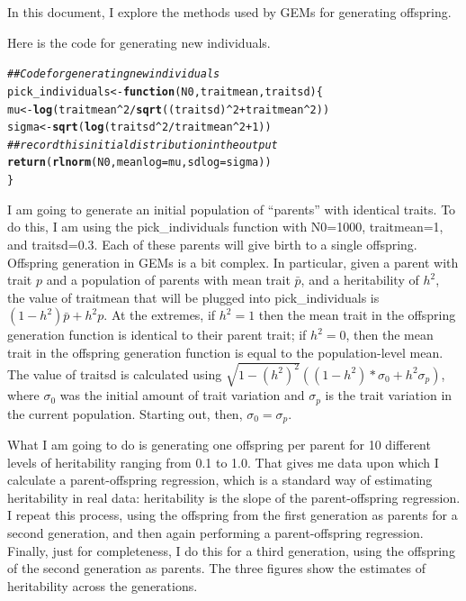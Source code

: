 \documentclass[12pt,reqno,final,pdftex]{amsart}\usepackage[]{graphicx}\usepackage[]{color}
\makeatletter
\newcommand{\hlnum}[1]{\textcolor[rgb]{0.686,0.059,0.569}{#1}}%
\newcommand{\hlcom}[1]{\textcolor[rgb]{0.678,0.584,0.686}{\textit{#1}}}%
\newcommand{\hlopt}[1]{\textcolor[rgb]{0,0,0}{#1}}%
\newcommand{\hlstd}[1]{\textcolor[rgb]{0.345,0.345,0.345}{#1}}%
\newcommand{\hlkwa}[1]{\textcolor[rgb]{0.161,0.373,0.58}{\textbf{#1}}}%
\newcommand{\hlkwb}[1]{\textcolor[rgb]{0.69,0.353,0.396}{#1}}%
\newcommand{\hlkwc}[1]{\textcolor[rgb]{0.333,0.667,0.333}{#1}}%
\newcommand{\hlkwd}[1]{\textcolor[rgb]{0.737,0.353,0.396}{\textbf{#1}}}%
\newenvironment{kframe}{%
 \def\at@end@of@kframe{}%
 \ifinner\ifhmode%
  \def\at@end@of@kframe{\end{minipage}}%
  \begin{minipage}{\columnwidth}%
 \fi\fi%
 \def\FrameCommand##1{\hskip\@totalleftmargin \hskip-\fboxsep
 \colorbox{shadecolor}{##1}\hskip-\fboxsep
     \hskip-\linewidth \hskip-\@totalleftmargin \hskip\columnwidth}%
 \MakeFramed {\advance\hsize-\width
   \@totalleftmargin\z@ \linewidth\hsize
   \@setminipage}}%
 {\par\unskip\endMakeFramed%
 \at@end@of@kframe}
\newenvironment{knitrout}{}{} %
\theoremstyle{plain}
\numberwithin{equation}{part}
\makeatother
\begin{document}
In this document, I explore the methods used by GEMs for generating offspring.

Here is the code for generating new individuals.
\begin{knitrout}\scriptsize
{}\color{fgcolor}\begin{kframe}
\begin{alltt}
\hlcom{## Code for generating new individuals}
\hlstd{pick_individuals} \hlkwb{<-} \hlkwa{function}\hlstd{(}\hlkwc{N0}\hlstd{,} \hlkwc{traitmean}\hlstd{,} \hlkwc{traitsd}\hlstd{) \{}
    \hlstd{mu} \hlkwb{<-} \hlkwd{log}\hlstd{(traitmean}\hlopt{^}\hlnum{2} \hlopt{/} \hlkwd{sqrt}\hlstd{((traitsd)}\hlopt{^}\hlnum{2}\hlopt{+}\hlstd{traitmean}\hlopt{^}\hlnum{2}\hlstd{))}
    \hlstd{sigma} \hlkwb{<-} \hlkwd{sqrt}\hlstd{(}\hlkwd{log}\hlstd{(traitsd}\hlopt{^}\hlnum{2}\hlopt{/}\hlstd{traitmean}\hlopt{^}\hlnum{2} \hlopt{+} \hlnum{1}\hlstd{))}
    \hlcom{## record this initial distribution in the output}
    \hlkwd{return}\hlstd{(}\hlkwd{rlnorm}\hlstd{(N0,} \hlkwc{meanlog}\hlstd{=mu,} \hlkwc{sdlog}\hlstd{=sigma))}
\hlstd{\}}
\end{alltt}
\end{kframe}
\end{knitrout}

I am going to generate an initial population of ``parents'' with identical traits.
To do this, I am using the pick\_individuals function with N0=1000, traitmean=1, and traitsd=0.3.
Each of these parents will give birth to a single offspring.
Offspring generation in GEMs is a bit complex.
In particular, given a parent with trait $p$ and a population of parents with mean trait $\bar{p}$, and a heritability of $h^2$, the value of traitmean that will be plugged into pick\_individuals is $(1-h^2)\bar{p} + h^2p$.
At the extremes, if $h^2=1$ then the mean trait in the offspring generation function is identical to their parent trait; if $h^2=0$, then the mean trait in the offspring generation function is equal to the population-level mean.
The value of traitsd is calculated using $\sqrt{1-(h^2)^2}\left((1-h^2)*\sigma_0 + h^2\sigma_p\right)$, where $\sigma_0$ was the initial amount of trait variation and $\sigma_p$ is the trait variation in the current population.
Starting out, then, $\sigma_0 = \sigma_p$.

What I am going to do is generating one offspring per parent for 10 different levels of heritability ranging from 0.1 to 1.0.
That gives me data upon which I calculate a parent-offspring regression, which is a standard way of estimating heritability in real data: heritability is the slope of the parent-offspring regression.
I repeat this process, using the offspring from the first generation as parents for a second generation, and then again performing a parent-offspring regression.
Finally, just for completeness, I do this for a third generation, using the offspring of the second generation as parents.
The three figures show the estimates of heritability across the generations.
\end{document}
